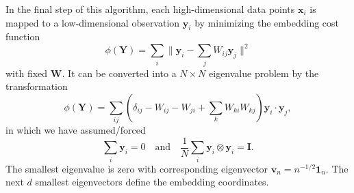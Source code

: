 In the final step of this algorithm, each high-dimensional data points $\mathbf{x}_i$ is mapped to a low-dimensional observation $\mathbf{y}_i$ by minimizing the embedding cost function
\begin{equation}
	\phi(\mathbf{Y})=\sum_i \lVert \mathbf{y}_i -\sum_j W_{ij}\mathbf{y}_j\rVert ^2
\end{equation}
with fixed $\mathbf{W}$. It can be converted into a $N\times N$ eigenvalue problem by the transformation
\begin{equation}
	\phi(\mathbf{Y})=\sum_{ij}(\delta_{ij}-W_{ij}-W_{ji}+\sum_k W_{ki}W_{kj})\mathbf{y}_i\cdot \mathbf{y}_j,
\end{equation}
in which we have assumed/forced
\begin{equation}
	\sum_i \mathbf{y}_i=0\quad \text{and} \quad \frac{1}{N}\sum_i \mathbf{y}_i\otimes \mathbf{y}_i=\mathbf{I}.
\end{equation}
The smallest eigenvalue is zero with corresponding eigenvector $\mathbf{v}_n=n^{-1/2}\mathbf{1}_n$. The next $d$ smallest eigenvectors define the embedding coordinates.